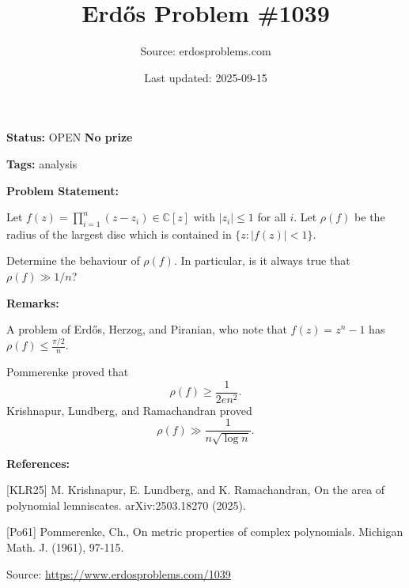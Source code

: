 \documentclass{article}
\title{Erd\H{o}s Problem \#1039}
\date{Last updated: 2025-09-15}
\author{Source: erdosproblems.com}
\begin{document}
\maketitle

\noindent\textbf{Status:} OPEN \quad \textbf{No prize}

\noindent\textbf{Tags:} analysis

\medskip
\noindent\textbf{Problem Statement:}

Let $f(z)=\prod_{i=1}^n(z-z_i)\in \mathbb{C}[z]$ with $\lvert z_i\rvert \leq 1$ for all $i$. Let $\rho(f)$ be the radius of the largest disc which is contained in $\{z: \lvert f(z)\rvert< 1\}$. 

Determine the behaviour of $\rho(f)$. In particular, is it always true that $\rho(f)\gg 1/n$?

\bigskip
\noindent\textbf{Remarks:}

A problem of Erd\H{o}s, Herzog, and Piranian, who note that $f(z)=z^n-1$ has $\rho(f) \leq \frac{\pi/2}{n}$.

Pommerenke \cite{Po61} proved that\[\rho(f) \geq \frac{1}{2en^2}.\]Krishnapur, Lundberg, and Ramachandran \cite{KLR25} proved\[\rho(f) \gg \frac{1}{n\sqrt{\log n}}.\]

\bigskip
\noindent\textbf{References:}

[KLR25] M. Krishnapur, E. Lundberg, and K. Ramachandran, On the area of polynomial lemniscates. arXiv:2503.18270 (2025).
 
 [Po61] Pommerenke, Ch., On metric properties of complex polynomials. Michigan Math. J. (1961), 97-115.

\bigskip
\noindent\small{Source: \url{https://www.erdosproblems.com/1039}}
\end{document}
